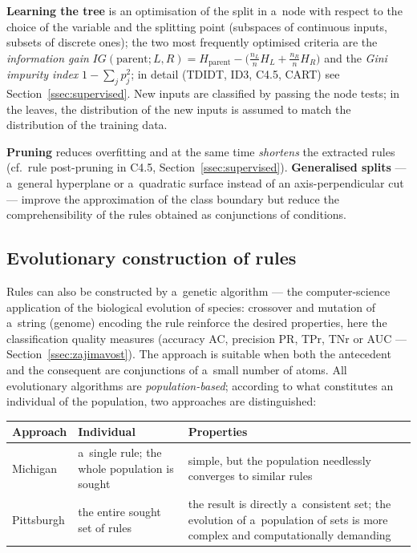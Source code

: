 \documentclass[11pt,a4paper]{article}
\theoremstyle{definition}
\begin{document}
\textbf{Learning the tree} is an optimisation of the split in a~node with respect to
the choice of the variable and the splitting point (subspaces of continuous inputs,
subsets of discrete ones); the two most frequently optimised criteria are the
\emph{information gain}
$IG(\text{parent};L,R)=H_{\text{parent}}-\big(\tfrac{n_L}{n}H_L+\tfrac{n_R}{n}H_R\big)$
and the \emph{Gini impurity index} $1-\sum_j p_j^2$; in detail (TDIDT, ID3, C4.5, CART)
see Section~\ref{ssec:supervised}. New inputs are classified by passing the node tests;
in the leaves, the distribution of the new inputs is assumed to match the distribution
of the training data.

\textbf{Pruning} reduces overfitting and at the same time \emph{shortens} the extracted
rules (cf.\ rule post-pruning in C4.5, Section~\ref{ssec:supervised}).
\textbf{Generalised splits} --- a~general hyperplane or a~quadratic surface instead of
an axis-perpendicular cut --- improve the approximation of the class boundary but
reduce the comprehensibility of the rules obtained as conjunctions of conditions.

\subsection{Evolutionary construction of rules}
\label{ssec:evoluce}

Rules can also be constructed by a~genetic algorithm --- the computer-science
application of the biological evolution of species: crossover and mutation of a~string
(genome) encoding the rule reinforce the desired properties, here the classification
quality measures (accuracy AC, precision PR, TPr, TNr or AUC ---
Section~\ref{ssec:zajimavost}). The approach is suitable when both the antecedent and
the consequent are conjunctions of a~small number of atoms. All evolutionary algorithms
are \emph{population-based}; according to what constitutes an individual of the
population, two approaches are distinguished:

\begin{center}
\small
\begin{tabular}{@{}lp{5.2cm}p{6.8cm}@{}}
\toprule
\textbf{Approach} & \textbf{Individual} & \textbf{Properties} \\
\midrule
Michigan & a~single rule; the whole population is sought & simple, but the population
  needlessly converges to similar rules \\
Pittsburgh & the entire sought set of rules & the result is directly a~consistent set;
  the evolution of a~population of sets is more complex and computationally demanding \\
\bottomrule
\end{tabular}
\end{center}
\end{document}
